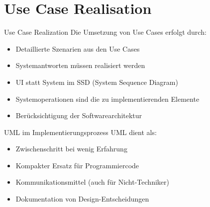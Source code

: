 \section{Use Case Realisation}

\begin{concept}{Use Case Realization}
Die Umsetzung von Use Cases erfolgt durch:
\begin{itemize}
    \item Detaillierte Szenarien aus den Use Cases
    \item Systemantworten müssen realisiert werden
    \item UI statt System im SSD (System Sequence Diagram)
    \item Systemoperationen sind die zu implementierenden Elemente
    \item Berücksichtigung der Softwarearchitektur
\end{itemize}
\end{concept}

\begin{definition}{UML im Implementierungsprozess}
UML dient als:
\begin{itemize}
    \item Zwischenschritt bei wenig Erfahrung
    \item Kompakter Ersatz für Programmiercode
    \item Kommunikationsmittel (auch für Nicht-Techniker)
    \item Dokumentation von Design-Entscheidungen
\end{itemize}
\end{definition}

